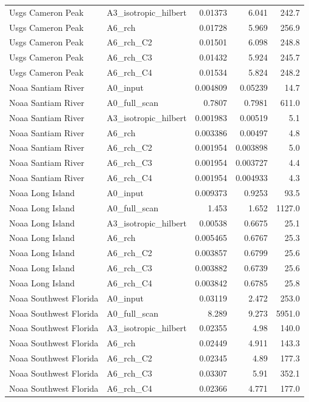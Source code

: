 \begin{table}[tbp]
\begin{tabular}{llrrr}
Usgs Cameron Peak & A3\_isotropic\_hilbert & 0.01373 & 6.041 & 242.7 \\
Usgs Cameron Peak & A6\_rch & 0.01728 & 5.969 & 256.9 \\
Usgs Cameron Peak & A6\_rch\_C2 & 0.01501 & 6.098 & 248.8 \\
Usgs Cameron Peak & A6\_rch\_C3 & 0.01432 & 5.924 & 245.7 \\
Usgs Cameron Peak & A6\_rch\_C4 & 0.01534 & 5.824 & 248.2 \\
Noaa Santiam River & A0\_input & 0.004809 & 0.05239 & 14.7 \\
Noaa Santiam River & A0\_full\_scan & 0.7807 & 0.7981 & 611.0 \\
Noaa Santiam River & A3\_isotropic\_hilbert & 0.001983 & 0.00519 & 5.1 \\
Noaa Santiam River & A6\_rch & 0.003386 & 0.00497 & 4.8 \\
Noaa Santiam River & A6\_rch\_C2 & 0.001954 & 0.003898 & 5.0 \\
Noaa Santiam River & A6\_rch\_C3 & 0.001954 & 0.003727 & 4.4 \\
Noaa Santiam River & A6\_rch\_C4 & 0.001954 & 0.004933 & 4.3 \\
Noaa Long Island & A0\_input & 0.009373 & 0.9253 & 93.5 \\
Noaa Long Island & A0\_full\_scan & 1.453 & 1.652 & 1127.0 \\
Noaa Long Island & A3\_isotropic\_hilbert & 0.00538 & 0.6675 & 25.1 \\
Noaa Long Island & A6\_rch & 0.005465 & 0.6767 & 25.3 \\
Noaa Long Island & A6\_rch\_C2 & 0.003857 & 0.6799 & 25.6 \\
Noaa Long Island & A6\_rch\_C3 & 0.003882 & 0.6739 & 25.6 \\
Noaa Long Island & A6\_rch\_C4 & 0.003842 & 0.6785 & 25.8 \\
Noaa Southwest Florida & A0\_input & 0.03119 & 2.472 & 253.0 \\
Noaa Southwest Florida & A0\_full\_scan & 8.289 & 9.273 & 5951.0 \\
Noaa Southwest Florida & A3\_isotropic\_hilbert & 0.02355 & 4.98 & 140.0 \\
Noaa Southwest Florida & A6\_rch & 0.02449 & 4.911 & 143.3 \\
Noaa Southwest Florida & A6\_rch\_C2 & 0.02345 & 4.89 & 177.3 \\
Noaa Southwest Florida & A6\_rch\_C3 & 0.03307 & 5.91 & 352.1 \\
Noaa Southwest Florida & A6\_rch\_C4 & 0.02366 & 4.771 & 177.0 \\
\bottomrule\end{tabular}\end{table}
